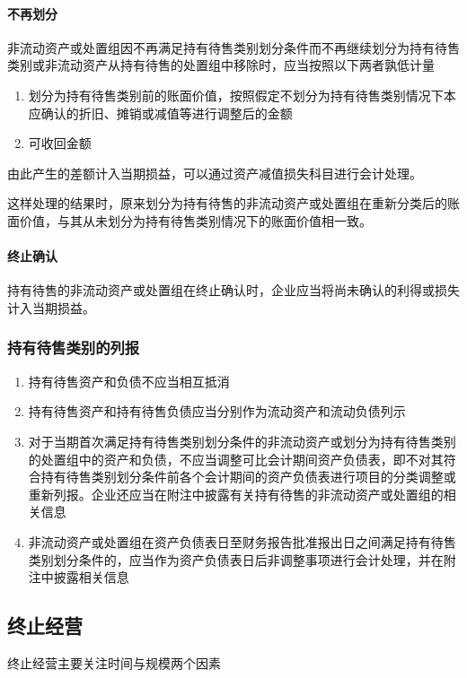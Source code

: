 \documentclass[UTF8,12pt]{ctexart}
\numberwithin{equation}{section} %
\numberwithin{figure}{section}
\numberwithin{table}{section}
\begin{document}
	\paragraph{不再划分}
	非流动资产或处置组因不再满足持有待售类别划分条件而不再继续划分为持有待售类别或非流动资产从持有待售的处置组中移除时，应当按照以下两者孰低计量
	\begin{enumerate}
		\item 划分为持有待售类别前的账面价值，按照假定不划分为持有待售类别情况下本应确认的折旧、摊销或减值等进行调整后的金额
		
		\item 可收回金额
	\end{enumerate}
	由此产生的差额计入当期损益，可以通过资产减值损失科目进行会计处理。
	
	这样处理的结果时，原来划分为持有待售的非流动资产或处置组在重新分类后的账面价值，与其从未划分为持有待售类别情况下的账面价值相一致。
	
	\paragraph{终止确认}
	持有待售的非流动资产或处置组在终止确认时，企业应当将尚未确认的利得或损失计入当期损益。
	
	\subsubsection{持有待售类别的列报}
	\begin{enumerate}
		\item 持有待售资产和负债不应当相互抵消
		
		\item 持有待售资产和持有待售负债应当分别作为流动资产和流动负债列示
		
		\item 对于当期首次满足持有待售类别划分条件的非流动资产或划分为持有待售类别的处置组中的资产和负债，不应当调整可比会计期间资产负债表，即不对其符合持有待售类别划分条件前各个会计期间的资产负债表进行项目的分类调整或重新列报。企业还应当在附注中披露有关持有待售的非流动资产或处置组的相关信息
		
		\item 非流动资产或处置组在资产负债表日至财务报告批准报出日之间满足持有待售类别划分条件的，应当作为资产负债表日后非调整事项进行会计处理，并在附注中披露相关信息
	\end{enumerate}
	
	\subsection{终止经营}
	终止经营主要关注时间与规模两个因素
\end{document}
